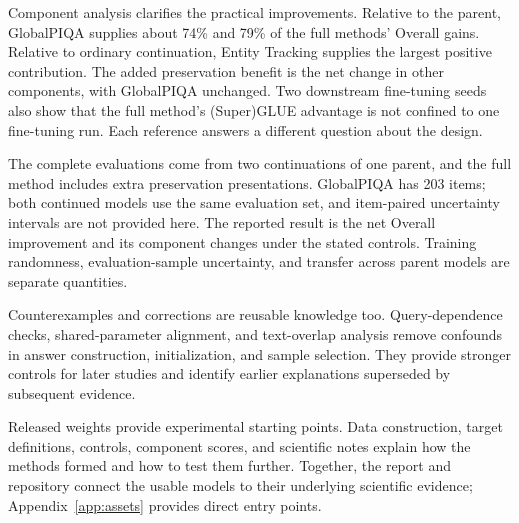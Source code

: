 Component analysis clarifies the practical improvements. Relative to the parent, GlobalPIQA supplies about 74\% and 79\% of the full methods' Overall gains. Relative to ordinary continuation, Entity Tracking supplies the largest positive contribution. The added preservation benefit is the net change in other components, with GlobalPIQA unchanged. Two downstream fine-tuning seeds also show that the full method's (Super)GLUE advantage is not confined to one fine-tuning run. Each reference answers a different question about the design.

The complete evaluations come from two continuations of one parent, and the full method includes extra preservation presentations. GlobalPIQA has 203 items; both continued models use the same evaluation set, and item-paired uncertainty intervals are not provided here. The reported result is the net Overall improvement and its component changes under the stated controls. Training randomness, evaluation-sample uncertainty, and transfer across parent models are separate quantities.

Counterexamples and corrections are reusable knowledge too. Query-dependence checks, shared-parameter alignment, and text-overlap analysis remove confounds in answer construction, initialization, and sample selection. They provide stronger controls for later studies and identify earlier explanations superseded by subsequent evidence.

Released weights provide experimental starting points. Data construction, target definitions, controls, component scores, and scientific notes explain how the methods formed and how to test them further. Together, the report and repository connect the usable models to their underlying scientific evidence; Appendix~\ref{app:assets} provides direct entry points.

